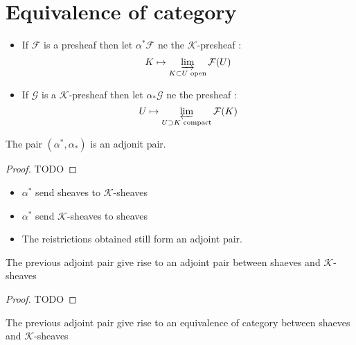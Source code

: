 \section{Equivalence of category}

\begin{definition}
    \label{def:adj_kprshv_and_prshv}
    \begin{itemize}
        \item If $\mathcal{F}$ is a presheaf then let $\alpha^*\mathcal{F}$ ne the $\mathcal{K}$-presheaf :\[K\mapsto \varinjlim\limits_{K\subset U \text{ open}}\mathcal{F}(U)\]
        \item If $\mathcal{G}$ is a $\mathcal{K}$-presheaf then let $\alpha_*\mathcal{G}$ ne the presheaf :\[ U\mapsto \varprojlim\limits_{U\supset K \text{ compact}}\mathcal{F}(K)\]
    \end{itemize}
\end{definition}

\begin{proposition}
    \label{pro:adj_kprshv_and_prshv}
    The pair $(\alpha^*,\alpha_*)$ is an adjonit pair.
\end{proposition}

\begin{proof}
    TODO
\end{proof}

\begin{lemma}
    \label{lem:adj_kshv_and_shv}
    \begin{itemize}
        \item $\alpha^*$ send sheaves to $\mathcal{K}$-sheaves
        \item $\alpha^*$ send $\mathcal{K}$-sheaves to sheaves
        \item The reistrictions obtained still form an adjoint pair.
    \end{itemize}
    The previous adjoint pair give rise to an adjoint pair between shaeves and $\mathcal{K}$-sheaves
\end{lemma}

\begin{proof}
    TODO
\end{proof}

\begin{lemma}
    \label{lem:kshv_equiv_shv}
    The previous adjoint pair give rise to an equivalence of category between shaeves and $\mathcal{K}$-sheaves
\end{lemma}

